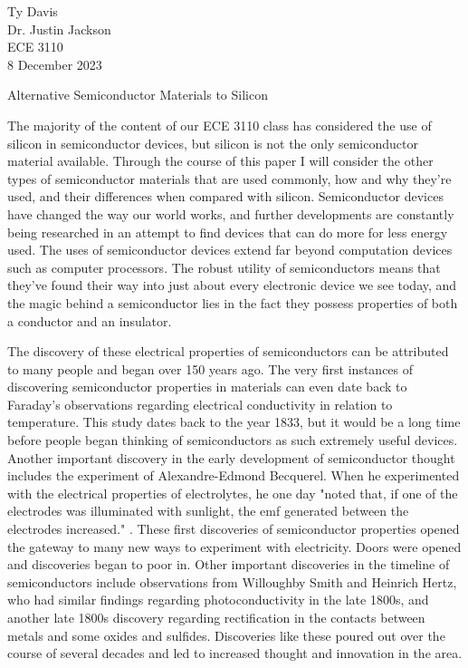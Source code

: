 \documentclass[12pt]{article}
\begin{document}
\begin{flushleft}

Ty Davis\\
Dr. Justin Jackson\\
ECE 3110\\
8 December 2023\\


\begin{center}
  Alternative Semiconductor Materials to Silicon
\end{center}



\setlength{\parindent}{0.5in}

The majority of the content of our ECE 3110 class
has considered the use of silicon in semiconductor
devices, but silicon is not the only semiconductor
material available. Through the course of this paper
I will consider the other types of semiconductor
materials that are used commonly, how and why they're
used, and their differences when compared with
silicon. Semiconductor devices have changed the way
our world works, and further developments are constantly
being researched in an attempt to find devices that
can do more for less energy used. The uses of 
semiconductor devices extend far beyond computation
devices such as computer processors. The robust 
utility of semiconductors means that they've found
their way into just about every electronic device 
we see today, and the magic behind a semiconductor
lies in the fact they possess properties of both a
conductor and an insulator. 

The discovery of these electrical properties of semiconductors
can be attributed to many people and began over 150
years ago. The very first instances of discovering
semiconductor properties in materials can even date
back to Faraday's observations regarding electrical
conductivity in relation to temperature. This study
dates back to the year 1833, but it would be a long
time before people began thinking of semiconductors
as such extremely useful devices. Another important
discovery in the early development of semiconductor
thought includes the experiment of Alexandre-Edmond
Becquerel. When he experimented with the electrical
properties of electrolytes, he one day "noted that,
if one of the electrodes was illuminated with sunlight,
the emf generated between the electrodes increased."
\parencite{TudorJenkins_2005}. These first discoveries
of semiconductor properties opened the gateway to many
new ways to experiment with electricity. Doors were
opened and discoveries began to poor in. Other important
discoveries in the timeline of semiconductors include
observations from Willoughby Smith and Heinrich Hertz,
who had similar findings regarding photoconductivity
in the late 1800s, and another late 1800s discovery
regarding rectification in the contacts between metals
and some oxides and sulfides. Discoveries like these
poured out over the course of several decades and led
to increased thought and innovation in the area.


\end{flushleft}
\end{document}
